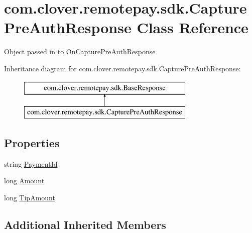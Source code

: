 \hypertarget{classcom_1_1clover_1_1remotepay_1_1sdk_1_1_capture_pre_auth_response}{}\section{com.\+clover.\+remotepay.\+sdk.\+Capture\+Pre\+Auth\+Response Class Reference}
\label{classcom_1_1clover_1_1remotepay_1_1sdk_1_1_capture_pre_auth_response}


Object passed in to On\+Capture\+Pre\+Auth\+Response  


Inheritance diagram for com.\+clover.\+remotepay.\+sdk.\+Capture\+Pre\+Auth\+Response\+:\begin{figure}[H]
\begin{center}
\leavevmode
\includegraphics[height=2.000000cm]{classcom_1_1clover_1_1remotepay_1_1sdk_1_1_capture_pre_auth_response}
\end{center}
\end{figure}
\subsection*{Properties}
\begin{DoxyCompactItemize}
\item 
string \hyperlink{classcom_1_1clover_1_1remotepay_1_1sdk_1_1_capture_pre_auth_response_a41045a580e984f23511756347661a879}{Payment\+Id}
\item 
long \hyperlink{classcom_1_1clover_1_1remotepay_1_1sdk_1_1_capture_pre_auth_response_a3298ac5c9d04049212f5f78fb16fd7dc}{Amount}
\item 
long \hyperlink{classcom_1_1clover_1_1remotepay_1_1sdk_1_1_capture_pre_auth_response_a0ecf754c393aeaca1e0c6c1ea7c9a406}{Tip\+Amount}
\end{DoxyCompactItemize}
\subsection*{Additional Inherited Members}


